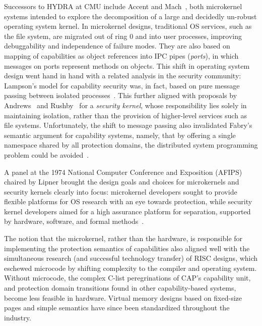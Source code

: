 Successors to HYDRA at CMU include Accent and Mach~\cite{Accent,accetta:mach},
both microkernel systems intended to
explore the decomposition of a large and decidedly un-robust operating system kernel.
In microkernel designs, traditional OS services, such as the file system, are
migrated out of ring 0 and into user processes, improving debuggability and
independence of failure modes.
They are also based on mapping of capabilities as object references into IPC pipes
({\em ports}), in which messages on ports represent methods on objects.
This shift in operating system design went hand in hand with a related analysis in the
security community: Lampson's model for capability security was, in fact, based on pure
message passing between isolated processes~\cite{lampson:protection}.
This further aligned with proposals by Andrews~\cite{andrews:partitions} and
Rushby~\cite{Rushby81} for a {\em security kernel}, whose responsibility lies
solely in maintaining isolation, rather than the provision of higher-level services such as file
systems.
Unfortunately, the shift to message passing also invalidated Fabry's semantic argument for
capability systems, namely, that by offering a single namespace shared by all protection domains,
the distributed system programming problem could be avoided~\cite{fabry:caseforcapabilities}.

A panel at the 1974 National Computer Conference and Exposition (AFIPS) chaired by Lipner
brought the design goals and choices for microkernels and security kernels clearly into
focus: microkernel developers sought to provide flexible platforms for OS research with an
eye towards protection, while security kernel developers aimed for a high assurance platform
for separation, supported by hardware, software, and formal
methods~\cite{lipner:securitykernels}.

The notion that the microkernel, rather than the hardware, is responsible for implementing
the protection semantics of capabilities also aligned well with the simultaneous research (and
successful technology transfer) of RISC designs, which eschewed microcode by shifting complexity
to the compiler and operating system.
Without microcode, the complex C-list peregrinations of CAP's capability unit, and protection domain
transitions found in other capability-based systems,
become less feasible in hardware.
Virtual memory designs based on fixed-size pages and simple semantics
have since been standardized throughout the industry.

